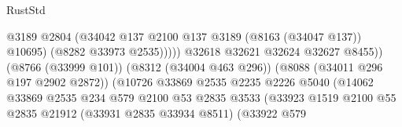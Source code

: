 \begin{lexlean}{RustStd}
\begin{coremodule}
                                                            @3189
                                                            @2804
                                                            (@34042
                                                              @137
                                                              @2100
                                                              @137
                                                              @3189
                                                              (@8163 (@34047 @137))
                                                              @10695)
                                                            (@8282 @33973 @2535)))))
                                                    @32618
                                                    @32621
                                                    @32624
                                                    @32627
                                                    @8455))
                                                (@8766 (@33999 @101))
                                                (@8312 (@34004 @463 @296))
                                                (@8088 (@34011 @296 @197 @2902 @2872))
                                                (@10726
                                                  @33869
                                                  @2535
                                                  @2235
                                                  @2226
                                                  @5040
                                                  (@14062
                                                    @33869
                                                    @2535
                                                    @234
                                                    @579
                                                    @2100
                                                    @53
                                                    @2835
                                                    @3533
                                                    (@33923
                                                      @1519
                                                      @2100
                                                      @55
                                                      @2835
                                                      @21912
                                                      (@33931 @2835 @33934 @8511)
                                                      (@33922
                                                        @579

\end{coremodule}
\end{lexlean}
